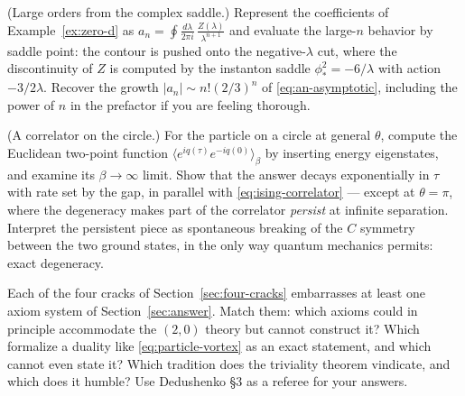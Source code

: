\begin{exercise}[medium]
\label{exr:large-order}
(Large orders from the complex saddle.) Represent the coefficients of
Example~\ref{ex:zero-d} as $a_n = \oint \frac{d\lambda}{2\pi i}\,
\frac{Z(\lambda)}{\lambda^{n+1}}$ and evaluate the large-$n$ behavior by saddle
point: the contour is pushed onto the negative-$\lambda$ cut, where the
discontinuity of $Z$ is computed by the instanton saddle $\phi_\ast^2 =
-6/\lambda$ with action $-3/2\lambda$. Recover the growth $|a_n| \sim
n!(2/3)^n$ of \eqref{eq:an-asymptotic}, including the power of $n$ in the
prefactor if you are feeling thorough.
\end{exercise}

\begin{exercise}[medium]
\label{exr:circle-correlator}
(A correlator on the circle.) For the particle on a circle at general $\theta$,
compute the Euclidean two-point function $\langle e^{iq(\tau)} e^{-iq(0)}
\rangle_\beta$ by inserting energy eigenstates, and examine its $\beta \to
\infty$ limit. Show that the answer decays exponentially in $\tau$ with rate set
by the gap, in parallel with \eqref{eq:ising-correlator} --- except at $\theta =
\pi$, where the degeneracy makes part of the correlator \emph{persist} at
infinite separation. Interpret the persistent piece as spontaneous breaking of
the $C$ symmetry between the two ground states, in the only way quantum
mechanics permits: exact degeneracy.
\end{exercise}

\begin{exercise}[thinker]
\label{exr:axioms-vs-cracks}
Each of the four cracks of Section~\ref{sec:four-cracks} embarrasses at least
one axiom system of Section~\ref{sec:answer}. Match them: which axioms could in
principle accommodate the $(2,0)$ theory but cannot construct it? Which
formalize a duality like \eqref{eq:particle-vortex} as an exact statement, and
which cannot even state it? Which tradition does the triviality theorem
vindicate, and which does it humble? Use Dedushenko  \S3 as a
referee for your answers.
\end{exercise}

